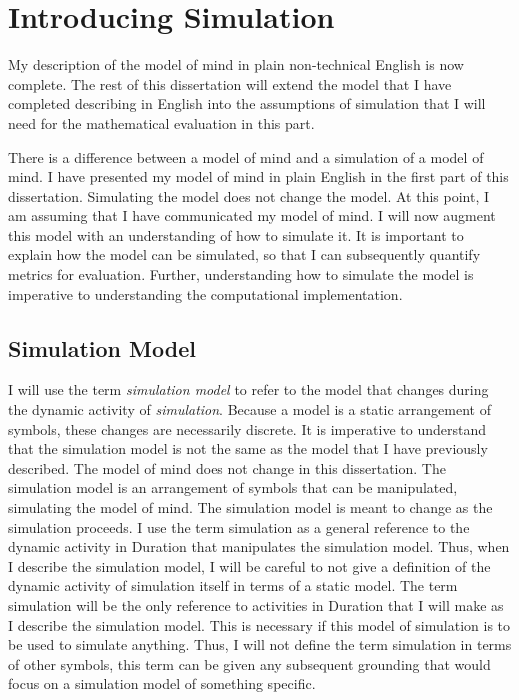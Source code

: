 \chapter{Introducing Simulation}
\label{chapter:introducing_simulation}

My description of the model of mind in plain non-technical English is
now complete.  The rest of this dissertation will extend the model
that I have completed describing in English into the assumptions of
simulation that I will need for the mathematical evaluation in this
part.

There is a difference between a model of mind and a simulation of a
model of mind.  I have presented my model of mind in plain English in
the first part of this dissertation.  Simulating the model does not
change the model.  At this point, I am assuming that I have
communicated my model of mind.  I will now augment this model with an
understanding of how to simulate it.  It is important to explain how
the model can be simulated, so that I can subsequently quantify
metrics for evaluation.  Further, understanding how to simulate the
model is imperative to understanding the computational implementation.

\section{Simulation Model}

I will use the term \emph{simulation model} to refer to the model that
changes during the dynamic activity of \emph{simulation}.  Because a
model is a static arrangement of symbols, these changes are
necessarily discrete.  It is imperative to understand that the
simulation model is not the same as the model that I have previously
described.  The model of mind does not change in this dissertation.
The simulation model is an arrangement of symbols that can be
manipulated, simulating the model of mind.  The simulation model is
meant to change as the simulation proceeds.  I use the term simulation
as a general reference to the dynamic activity in Duration that
manipulates the simulation model.  Thus, when I describe the
simulation model, I will be careful to not give a definition of the
dynamic activity of simulation itself in terms of a static model.  The
term simulation will be the only reference to activities in Duration
that I will make as I describe the simulation model.  This is
necessary if this model of simulation is to be used to simulate
anything.  Thus, I will not define the term simulation in terms of
other symbols, this term can be given any subsequent grounding that
would focus on a simulation model of something specific.

